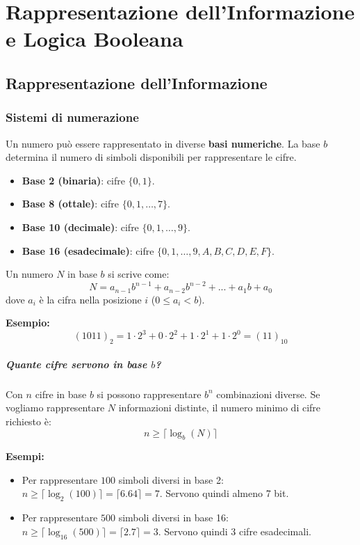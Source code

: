 \documentclass[oneside]{scrbook}
\begin{document}
\chapter{Rappresentazione dell'Informazione e Logica Booleana}


\section{Rappresentazione dell'Informazione}

\subsection{Sistemi di numerazione}
Un numero può essere rappresentato in diverse \textbf{basi numeriche}.  
La base $b$ determina il numero di simboli disponibili per rappresentare le cifre.  

\begin{itemize}
  \item \textbf{Base 2 (binaria)}: cifre $\{0,1\}$.
  \item \textbf{Base 8 (ottale)}: cifre $\{0,1,\dots,7\}$.
  \item \textbf{Base 10 (decimale)}: cifre $\{0,1,\dots,9\}$.
  \item \textbf{Base 16 (esadecimale)}: cifre $\{0,1,\dots,9,A,B,C,D,E,F\}$.
\end{itemize}

Un numero $N$ in base $b$ si scrive come:
\[
N = a_{n-1}b^{n-1} + a_{n-2}b^{n-2} + ... + a_1 b + a_0
\]
dove $a_i$ è la cifra nella posizione $i$ ($0 \leq a_i < b$).

\textbf{Esempio:}
\[
(1011)_2 = 1\cdot 2^3 + 0\cdot 2^2 + 1\cdot 2^1 + 1\cdot 2^0 = (11)_{10}
\]

\paragraph{Quante cifre servono in base $b$?}  
Con $n$ cifre in base $b$ si possono rappresentare $b^n$ combinazioni diverse.  
Se vogliamo rappresentare $N$ informazioni distinte, il numero minimo di cifre richiesto è:
\[
n \geq \lceil \log_b(N) \rceil
\]

\textbf{Esempi:}
\begin{itemize}
  \item Per rappresentare $100$ simboli diversi in base 2:  
  $n \geq \lceil \log_2(100) \rceil = \lceil 6.64 \rceil = 7$.  
  Servono quindi almeno 7 bit.
  \item Per rappresentare $500$ simboli diversi in base 16:  
  $n \geq \lceil \log_{16}(500) \rceil = \lceil 2.7 \rceil = 3$.  
  Servono quindi 3 cifre esadecimali.
\end{itemize}
\end{document}
